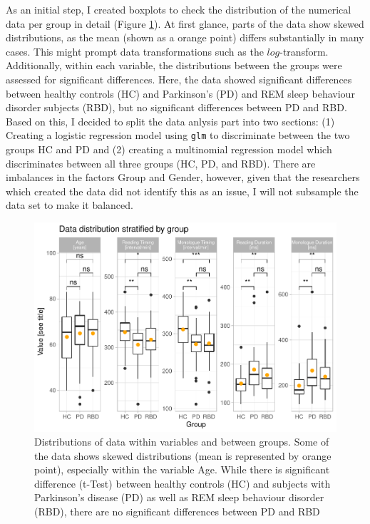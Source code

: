 \documentclass[
  english,
  doc,floatsintext]{apa6}
\begin{document}
As an initial step, I created boxplots to check the distribution of the numerical data per group
in detail (Figure \ref{fig:boxplots-and-correlations}).
At first glance, parts of the data show skewed distributions, as the mean (shown as a orange point)
differs substantially in many cases. This might prompt data transformations such as the \(log\)-transform.
Additionally, within each variable, the distributions between the groups were assessed for significant differences.
Here, the data showed significant differences between healthy controls (HC) and Parkinson's (PD) and REM sleep
behaviour disorder subjects (RBD), but no significant differences between PD and RBD. Based on this, I decided
to split the data anlysis part into two sections: (1) Creating a logistic regression model using \texttt{glm} to
discriminate between the two groups HC and PD and (2) creating a multinomial regression model which discriminates
between all three groups (HC, PD, and RBD). There are imbalances in the factors Group and Gender, however, given that
the researchers which created the data did not identify this as an issue, I will not subsample the data set to make
it balanced.

\begin{figure}

{\centering \includegraphics{dap_report_anja_probst_files/figure-latex/boxplots-and-correlations-1} 

}

\caption{Distributions of data within variables and between groups. Some of the data shows skewed distributions (mean is represented by orange point), especially within the variable Age. While there is significant difference (t-Test) between healthy controls (HC) and subjects with Parkinson's disease (PD) as well as REM sleep behaviour disorder (RBD), there are no significant differences between PD and RBD}\label{fig:boxplots-and-correlations}
\end{figure}
\end{document}
